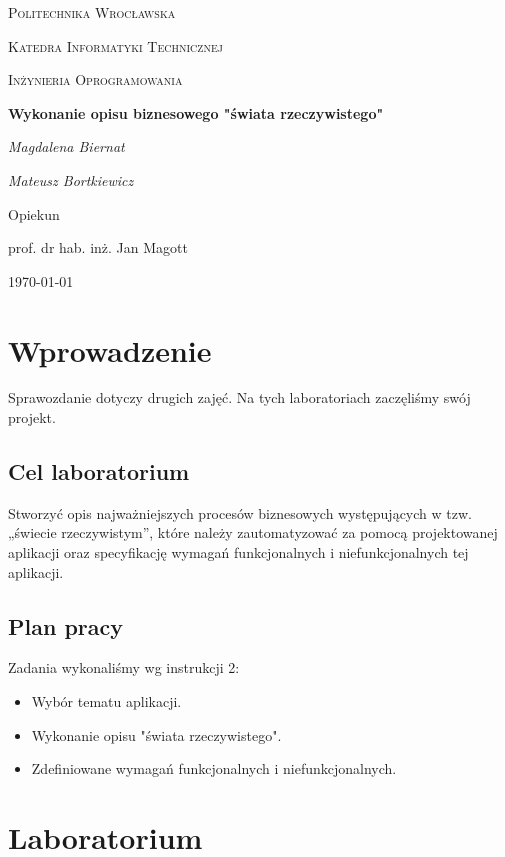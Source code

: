 \documentclass{article}
\begin{document}
\begin{titlepage}
\centering
{\scshape\LARGE Politechnika Wrocławska \par}
{\scshape\Large Katedra Informatyki Technicznej\par}

	\vspace{1cm}
	{\scshape\Large Inżynieria Oprogramowania\par}
	\vspace{1.5cm}
	{\huge\bfseries Wykonanie opisu biznesowego "świata rzeczywistego"\par}
	\vspace{2cm}
	{\Large\itshape Magdalena Biernat\par}
	{\Large\itshape Mateusz Bortkiewicz\par}
	\vfill
	Opiekun\par
	prof. dr hab. inż. Jan Magott 

	\vfill
	{\large \today\par}
\end{titlepage}
\newpage

\section{Wprowadzenie}
Sprawozdanie dotyczy drugich zajęć. Na tych laboratoriach zaczęliśmy swój projekt. 

\subsection{Cel laboratorium}
Stworzyć opis najważniejszych procesów biznesowych występujących w tzw. „świecie rzeczywistym”, które należy zautomatyzować za pomocą projektowanej aplikacji oraz specyfikację wymagań funkcjonalnych i niefunkcjonalnych tej aplikacji.

\subsection{Plan pracy}
Zadania wykonaliśmy wg instrukcji 2:
\begin{itemize}
\item Wybór tematu aplikacji.
\item Wykonanie opisu "świata rzeczywistego".
\item Zdefiniowane wymagań funkcjonalnych i niefunkcjonalnych. 
\end{itemize}
\section{Laboratorium}
\end{document}

